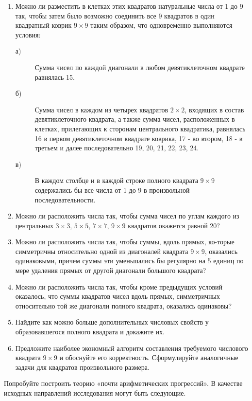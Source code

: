 \begin{enumerate}
\item Можно ли разместить в клетках этих квадратов натуральные числа от 1 до 9 так, чтобы затем было возможно соединить все 9 квадратов в один квадратный коврик  $9\times9$ таким образом, что одновременно выполняются условия:
     \begin{description}
      \item [а) ]Сумма чисел по каждой диагонали в любом девятиклеточном квадрате равнялась 15.
      \item [б) ]Сумма чисел в каждом из четырех квадратов $2\times2$, входящих в состав девятиклеточного квадрата, а также сумма чисел, расположенных в клетках,         прилегающих к сторонам центрального квадратика, равнялась 16 в первом девятиклеточном квадрате коврика, 17 - во втором, 18 - в третьем и далее последовательно 19, 20, 21, 22, 23, 24.
      \item [в) ]В каждом столбце и в каждой строке полного квадрата $9\times9$ содержались бы все числа от 1 до 9 в произвольной последовательности.
    \end{description}
    
\item Можно ли расположить числа так, чтобы сумма чисел по углам каждого из центральных $3\times3$, $5\times5$, $7\times7$, $9\times9$ квадратов окажется равной 20?
\item Можно ли расположить числа так, чтобы суммы, вдоль прямых, ко-\linebreak торые симметричны относительно одной из диагоналей квадрата $9\times9$, оказались одинаковыми, причем суммы эти уменьшались бы регулярно на 5 единиц по мере удаления прямых от другой диагонали большого квадрата?
\item Можно ли расположить числа так, чтобы кроме предыдущих условий оказалось, что суммы квадратов чисел вдоль прямых, симметричных относительно той же диагонали полного квадрата, оказались одинаковы?
\item Найдите как можно больше дополнительных числовых свойств у образовавшегося полного квадрата и докажите их.
\item Предложите наиболее экономный алгоритм составления требуемого числового квадрата $9\times 9$ и обоснуйте его корректность. Сформулируйте аналогичные задачи для квадратов произвольного размера.
\end{enumerate}


Попробуйте построить теорию «почти арифметических прогрессий». В качестве исходных направлений исследования могут быть следующие.

